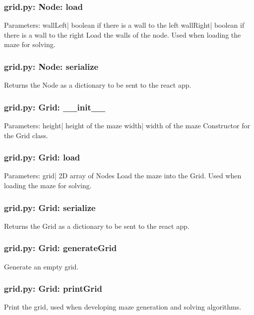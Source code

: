 \documentclass[titlepage]{article}
\begin{document}
\subsubsection{grid.py: Node: load}
Parameters:\newline
\indent wallLeft| boolean if there is a wall to the left\newline
\indent wallRight| boolean if there is a wall to the right\newline
Load the walls of the node. Used when loading the maze for solving.

\subsubsection{grid.py: Node: serialize}
Returns the Node as a dictionary to be sent to the react app.

\subsubsection{grid.py: Grid: \_\_init\_\_}
Parameters:\newline
\indent height| height of the maze\newline
\indent width| width of the maze\newline
Constructor for the Grid class.

\subsubsection{grid.py: Grid: load}
Parameters:\newline
\indent grid| 2D array of Nodes\newline
Load the maze into the Grid. Used when loading the maze for solving.

\subsubsection{grid.py: Grid: serialize}
Returns the Grid as a dictionary to be sent to the react app.


\subsubsection{grid.py: Grid: generateGrid}
Generate an empty grid.

\subsubsection{grid.py: Grid: printGrid}
Print the grid, used when developing maze generation and solving algorithms.
\end{document}
